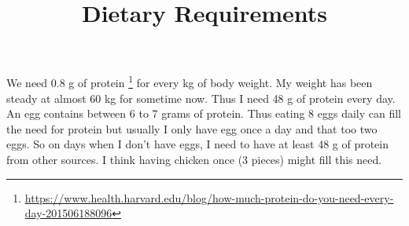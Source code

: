 \documentclass{../template/texnote}
\title{Dietary Requirements}
\begin{document}
    \maketitle {}
    We need 0.8 g of protein \footnote{\url{https://www.health.harvard.edu/blog/how-much-protein-do-you-need-every-day-201506188096}}
    for every kg of body weight.
    My weight has been steady at almost 60 kg for sometime now. Thus I need 48 g of protein every day.
    An egg contains between 6 to 7 grams of protein.
    Thus eating 8 eggs daily can fill the need for protein but usually I only have egg once a day and that too two eggs.
    So on days when I don't have eggs, I need to have at least 48 g of protein from other sources.
    I think having chicken once (3 pieces) might fill this need.
    \printbibliography
\end{document}
